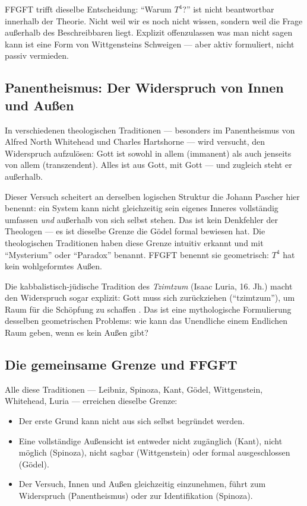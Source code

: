FFGFT trifft dieselbe Entscheidung: ``Warum $T^4$?'' ist nicht beantwortbar innerhalb der Theorie. Nicht weil wir es noch nicht wissen, sondern weil die Frage außerhalb des Beschreibbaren liegt. Explizit offenzulassen was man nicht sagen kann ist eine Form von Wittgensteins Schweigen --- aber aktiv formuliert, nicht passiv vermieden.

\subsection{Panentheismus: Der Widerspruch von Innen und Außen}

In verschiedenen theologischen Traditionen --- besonders im Panentheismus von Alfred North Whitehead \cite{Whitehead1929} und Charles Hartshorne --- wird versucht, den Widerspruch aufzulösen: Gott ist sowohl in allem (immanent) als auch jenseits von allem (transzendent). Alles ist aus Gott, mit Gott --- und zugleich steht er außerhalb.

Dieser Versuch scheitert an derselben logischen Struktur die Johann Pascher hier benennt: ein System kann nicht gleichzeitig sein eigenes Inneres vollständig umfassen \emph{und} außerhalb von sich selbst stehen. Das ist kein Denkfehler der Theologen --- es ist dieselbe Grenze die Gödel formal bewiesen hat. Die theologischen Traditionen haben diese Grenze intuitiv erkannt und mit ``Mysterium'' oder ``Paradox'' benannt. FFGFT benennt sie geometrisch: $T^4$ hat kein wohlgeformtes Außen.

Die kabbalistisch-jüdische Tradition des \emph{Tzimtzum} (Isaac Luria, 16. Jh.) macht den Widerspruch sogar explizit: Gott muss sich zurückziehen (``tzimtzum''), um Raum für die Schöpfung zu schaffen \cite{Scholem1941}. Das ist eine mythologische Formulierung desselben geometrischen Problems: wie kann das Unendliche einem Endlichen Raum geben, wenn es kein Außen gibt?

\subsection{Die gemeinsame Grenze und FFGFT}

Alle diese Traditionen --- Leibniz, Spinoza, Kant, Gödel, Wittgenstein, Whitehead, Luria --- erreichen dieselbe Grenze:

\begin{itemize}
  \item Der erste Grund kann nicht aus sich selbst begründet werden.
  \item Eine vollständige Außensicht ist entweder nicht zugänglich (Kant), nicht möglich (Spinoza), nicht sagbar (Wittgenstein) oder formal ausgeschlossen (Gödel).
  \item Der Versuch, Innen und Außen gleichzeitig einzunehmen, führt zum Widerspruch (Panentheismus) oder zur Identifikation (Spinoza).
\end{itemize}

